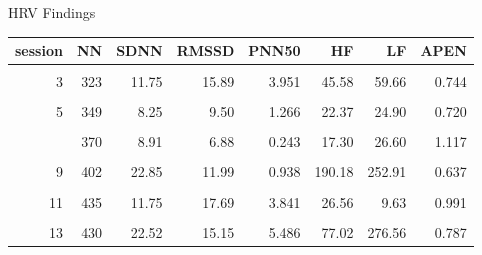 \documentclass[
  ignorenonframetext,
  unknownkeysallowed]{beamer}
\begin{document}
\begin{frame}{HRV Findings}
\protect\hypertarget{hrv-findings}{}

\begin{table}[H]
\centering\begingroup\fontsize{6}{8}\selectfont

\begin{tabular}{rrrrrrrr}
\toprule
session & NN & SDNN & RMSSD & PNN50 & HF & LF & APEN\\
\midrule
\cellcolor{gray!6}{1} & \cellcolor{gray!6}{341} & \cellcolor{gray!6}{13.06} & \cellcolor{gray!6}{4.96} & \cellcolor{gray!6}{0.000} & \cellcolor{gray!6}{59.17} & \cellcolor{gray!6}{249.83} & \cellcolor{gray!6}{0.575}\\
3 & 323 & 11.75 & 15.89 & 3.951 & 45.58 & 59.66 & 0.744\\
\cellcolor{gray!6}{4} & \cellcolor{gray!6}{326} & \cellcolor{gray!6}{19.95} & \cellcolor{gray!6}{31.74} & \cellcolor{gray!6}{15.081} & \cellcolor{gray!6}{59.62} & \cellcolor{gray!6}{54.85} & \cellcolor{gray!6}{0.665}\\
5 & 349 & 8.25 & 9.50 & 1.266 & 22.37 & 24.90 & 0.720\\
\cellcolor{gray!6}{6} & \cellcolor{gray!6}{342} & \cellcolor{gray!6}{16.82} & \cellcolor{gray!6}{25.47} & \cellcolor{gray!6}{8.304} & \cellcolor{gray!6}{73.46} & \cellcolor{gray!6}{48.28} & \cellcolor{gray!6}{0.567}\\
\addlinespace
7 & 370 & 8.91 & 6.88 & 0.243 & 17.30 & 26.60 & 1.117\\
\cellcolor{gray!6}{8} & \cellcolor{gray!6}{430} & \cellcolor{gray!6}{7.25} & \cellcolor{gray!6}{6.24} & \cellcolor{gray!6}{0.208} & \cellcolor{gray!6}{9.60} & \cellcolor{gray!6}{30.01} & \cellcolor{gray!6}{1.028}\\
9 & 402 & 22.85 & 11.99 & 0.938 & 190.18 & 252.91 & 0.637\\
\cellcolor{gray!6}{10} & \cellcolor{gray!6}{449} & \cellcolor{gray!6}{12.77} & \cellcolor{gray!6}{10.18} & \cellcolor{gray!6}{1.546} & \cellcolor{gray!6}{53.81} & \cellcolor{gray!6}{35.00} & \cellcolor{gray!6}{0.918}\\
11 & 435 & 11.75 & 17.69 & 3.841 & 26.56 & 9.63 & 0.991\\
\addlinespace
\cellcolor{gray!6}{12} & \cellcolor{gray!6}{323} & \cellcolor{gray!6}{5.83} & \cellcolor{gray!6}{6.43} & \cellcolor{gray!6}{0.075} & \cellcolor{gray!6}{13.36} & \cellcolor{gray!6}{12.36} & \cellcolor{gray!6}{1.142}\\
13 & 430 & 22.52 & 15.15 & 5.486 & 77.02 & 276.56 & 0.787\\

\end{tabular}
\end{table}
\end{frame}
\end{document}
